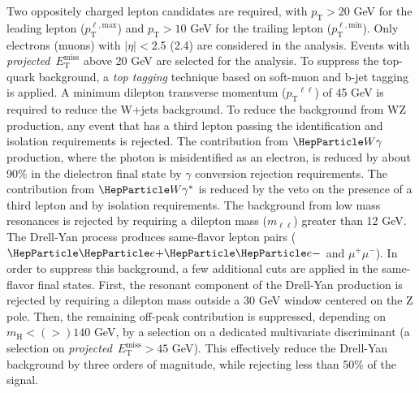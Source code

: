 \documentclass{cimento}
\newcommand{\mH}{\ensuremath{m_{\mathrm{H}}}\xspace}
\newcommand{\pt}{\ensuremath{p_{\mathrm{T}}}\xspace}
\newcommand{\ETm}{\ensuremath{E_{\mathrm{T}}^{\text{miss}}}\xspace}
\newcommand{\Lep}{\ensuremath{\mathrm{\ell}}}
\newcommand{\ptlmax}{\ensuremath{p_{\mathrm{T}}^{\Lep,\mathrm{max}}}}
\newcommand{\ptlmin}{\ensuremath{p_{\mathrm{T}}^{\Lep,\mathrm{min}}}}
\begin{document}
Two oppositely charged lepton candidates are required, with $\pt >20$
GeV for the leading lepton ($\ptlmax$) and $\pt >10$ GeV for the
trailing lepton ($\ptlmin$).  Only electrons (muons) with $|\eta|
<$2.5 (2.4) are considered in the analysis.  Events with
\textit{projected}~$\ETm$ above 20 GeV are selected for the analysis.
To suppress the top-quark background, a \textit{top tagging} technique
based on soft-muon and b-jet tagging is applied.  A
minimum dilepton transverse momentum ($\pt^{\ell\ell}$) of 45 GeV is
required to reduce the W+jets background.  To reduce the background
from WZ production, any event that has a third lepton passing the
identification and isolation requirements is rejected. The
contribution from $\PW\gamma$ production, where the photon is
misidentified as an electron, is reduced by about 90\% in the
dielectron final state by $\gamma$ conversion rejection requirements.
The contribution from $\PW\gamma^{*}$ is reduced by the veto on the
presence of a third lepton and by isolation requirements.  The
background from low mass resonances is rejected by requiring a
dilepton mass ($m_{\ell\ell}$) greater than 12 GeV.  The Drell-Yan
process produces same-flavor lepton pairs ($\Pep\Pem$ and
$\mu^+\mu^-$). In order to suppress this background, a few additional
cuts are applied in the same-flavor final states.  First, the resonant
component of the Drell-Yan production is rejected by requiring a
dilepton mass outside a 30 GeV window centered on the Z pole.  Then,
the remaining off-peak contribution is suppressed, depending on
$\mH<(>)140$ GeV, by a selection on a dedicated multivariate
discriminant (a selection on \textit{projected}~$\ETm>45$ GeV). This
effectively reduce the Drell-Yan background by three orders of
magnitude, while rejecting less than 50\% of the signal.
\end{document}
